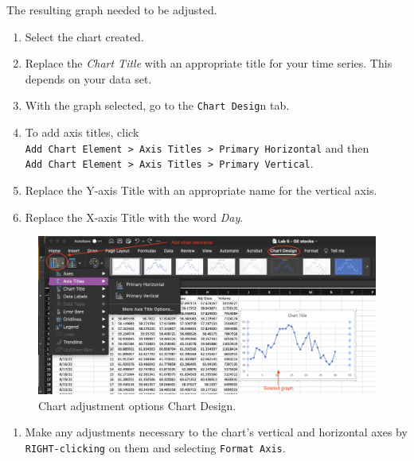 \documentclass[
]{book}
\providecommand{\tightlist}{%
  \setlength{\itemsep}{0pt}\setlength{\parskip}{0pt}}
\begin{document}
The resulting graph needed to be adjusted.

\begin{enumerate}
\def\labelenumi{\arabic{enumi}.}
\setcounter{enumi}{2}
\tightlist
\item
  Select the chart created.
\item
  Replace the \emph{Chart Title} with an appropriate title for your time series. This depends on your data set.
\item
  With the graph selected, go to the \texttt{Chart\ Desig}n tab.
\item
  To add axis titles, click \texttt{Add\ Chart\ Element\ \textgreater{}\ Axis\ Titles\ \textgreater{}\ Primary\ Horizontal} and then \texttt{Add\ Chart\ Element\ \textgreater{}\ Axis\ Titles\ \textgreater{}\ Primary\ Vertical}.
\item
  Replace the Y-axis Title with an appropriate name for the vertical axis.
\item
  Replace the X-axis Title with the word \emph{Day}.
\end{enumerate}

\begin{figure}

{\centering \includegraphics[width=0.95\linewidth]{adjust-scatter} 

}

\caption{Chart adjustment options Chart Design.}\label{fig:adjust-scatter}
\end{figure}

\begin{enumerate}
\def\labelenumi{\arabic{enumi}.}
\setcounter{enumi}{8}
\tightlist
\item
  Make any adjustments necessary to the chart's vertical and horizontal axes by \texttt{RIGHT-clicking} on them and selecting \texttt{Format\ Axis}.
\end{enumerate}
\end{document}

